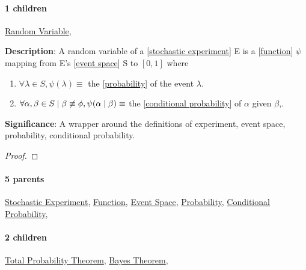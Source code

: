 \documentclass[../main.tex]{subfiles}
\begin{document}
\paragraph{1 children} \hyperref[statement:Random Variable]{Random Variable}, 




\begin{statement}
\label{statement:Random Variable}\hspace*{0pt}\par
\end{statement}
\textbf{Description}:
A random variable of a [\hyperref[statement:Stochastic Experiment]{stochastic experiment}] E is a [\hyperref[statement:Function]{function}] $ \psi $ mapping from E's [\hyperref[statement:Event Space]{event space}] S to $ [0, 1] $ where
\begin{enumerate}[nolistsep]
    \item $ \forall \lambda \in S, \psi(\lambda) \equiv $ the [\hyperref[statement:Probability]{probability}] of the event $ \lambda $.
    \item $ \forall \alpha, \beta \in S \mid \beta \not\equiv \phi, \psi(\alpha\mid\beta) \equiv $ the [\hyperref[statement:Conditional Probability]{conditional probability}] of $ \alpha $ given $ \beta $,.
\end{enumerate}
\par
{\color{magenta} \textbf{Significance}:
A wrapper around the definitions of experiment, event space, probability, conditional probability.
\par}
\begin{proof}
\proofbydefinition
\end{proof}\par
\paragraph{5 parents} \hyperref[statement:Stochastic Experiment]{Stochastic Experiment}, \hyperref[statement:Function]{Function}, \hyperref[statement:Event Space]{Event Space}, \hyperref[statement:Probability]{Probability}, \hyperref[statement:Conditional Probability]{Conditional Probability}, 
\paragraph{2 children} \hyperref[statement:Total Probability Theorem]{Total Probability Theorem}, \hyperref[statement:Bayes Theorem]{Bayes Theorem}, 
\end{document}
